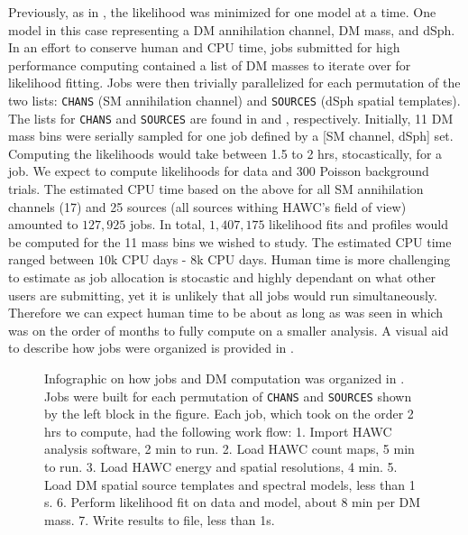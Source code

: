 Previously, as in , the likelihood was minimized for one model at a time.
One model in this case representing a DM annihilation channel, DM mass, and dSph.
In an effort to conserve human and CPU time, jobs submitted for high performance computing contained a list of DM masses to iterate over for likelihood fitting.
Jobs were then trivially parallelized for each permutation of the two lists: \texttt{CHANS} (SM annihilation channel) and \texttt{SOURCES} (dSph spatial templates).
The lists for \texttt{CHANS} and \texttt{SOURCES} are found in  and , respectively.
Initially, 11 DM mass bins were serially sampled for one job defined by a [SM channel, dSph] set.
Computing the likelihoods would take between 1.5 to 2 hrs, stocastically, for a job.
We expect to compute likelihoods for data and 300 Poisson background trials.
The estimated CPU time based on the above for all SM annihilation channels (17) and 25 sources (all \LS sources withing HAWC's field of view) amounted to $127,925$ jobs.
In total, $1,407,175$ likelihood fits and profiles would be computed for the 11 mass bins we wished to study.
The estimated CPU time ranged between $10$k CPU days - $8$k CPU days.
Human time is more challenging to estimate as job allocation is stocastic and highly dependant on what other users are submitting, yet it is unlikely that all jobs would run simultaneously.
Therefore we can expect human time to be about as long as was seen in  which was on the order of months to fully compute on a smaller analysis.
A visual aid to describe how jobs were organized is provided in .

\begin{figure}[h]
    \caption{Infographic on how jobs and DM computation was organized in . Jobs were built for each permutation of \texttt{CHANS} and \texttt{SOURCES} shown by the left block in the figure. Each job, which took on the order 2 hrs to compute, had the following work flow: 1. Import HAWC analysis software, 2 min to run. 2. Load HAWC count maps, 5 min to run. 3. Load HAWC energy and spatial resolutions, 4 min. 5. Load DM spatial source templates and spectral models, less than 1 s. 6. Perform likelihood fit on data and model, about 8 min per DM mass. 7. Write results to file, less than 1s.}
    \label{fig:mtd_gd_workflow}
\end{figure}


